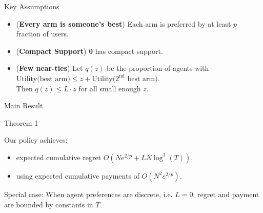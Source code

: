 \documentclass[serif]{beamer}
\begin{document}
\begin{frame}{Key Assumptions}
\begin{itemize}
\item (\textbf{Every arm is someone's best}) Each arm is preferred by at least $p$ fraction of users.
\vspace{0.2cm}
\item (\textbf{Compact Support}) $\bm{\theta}$ has compact support.
\vspace{0.2cm}
\item (\textbf{Few near-ties}) 
Let $q(z)$ be the proportion of agents with
$\text{Utility(best arm)} \le z + \text{Utility($2^{\mathrm{nd}}$ best arm)}$.\\
Then $q(z)\leq L\cdot z$ for all small enough $z$.
\end{itemize}

\end{frame}

\begin{frame}{Main Result}
\begin{block}{Theorem 1}

Our policy achieves:
\begin{itemize}
\item expected cumulative regret $O (N e^{2/p} + L N \log^3(T))$,
\item using expected cumulative payments of $O(N^2 e^{2/p})$.
\end{itemize}
\end{block}

Special case: 
When agent preferences are discrete, i.e. $L=0$,
regret and payment are bounded by constants in $T$.



\end{frame}
\end{document}
